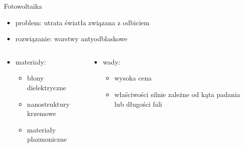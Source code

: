 \documentclass{beamer}
\begin{document}
\begin{frame}{Fotowoltaika}
    \begin{itemize}
        \item problem: utrata światła związana z odbiciem
        \item rozwiązanie: warstwy antyodblaskowe
    \end{itemize}
    \begin{columns}
        \begin{column}{0.5\textwidth}
            \begin{itemize}
            \item materiały:
            \begin{itemize}
                \item błony dielektryczne
                \item nanostruktury krzemowe
                \item materiały plazmoniczne
            \end{itemize}
            \end{itemize}
        \end{column}
        \begin{column}{0.5\textwidth}
            \begin{itemize}
            \item wady:
            \begin{itemize}
                \item wysoka cena
                \item właściwości silnie zależne od kąta padania lub długości fali
            \end{itemize}
            \end{itemize}
        \end{column}
    \end{columns}
\end{frame}
\end{document}
